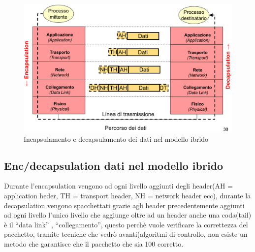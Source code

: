     \begin{figure}[h!]
    \centering
    \includegraphics[width=1.2\textwidth]{images/enc_dec_ibrido.png}
    \caption{Incapsulamento e decapsulamento dei dati nel modello ibrido}
    \label{fig:modello_ibrido_enc_decapsulamento}
\end{figure}

\subsection{Enc/decapsulation dati nel modello ibrido}
Durante l'encapsulation vengono ad ogni livello aggiunti degli header(AH = application heder, TH = transport header, NH = network header ecc), durante la decapsulation vengono spacchettati grazie agli header precedentemente aggiunti ad ogni livello
l'unico livello che aggiunge oltre ad un header anche una coda(tail) è il “data link” , “collegamento”, questo perchè vuole verificare la correttezza del pacchetto, tramite tecniche che vedrò avanti(algoritmi di controllo, non esiste un metodo che garantisce che il pacchetto che sia 100 corretto.%

